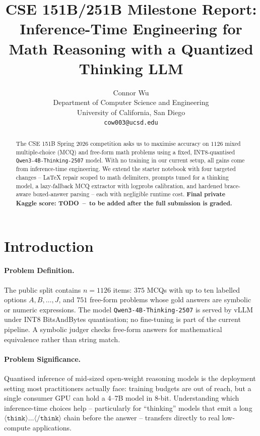 \documentclass{article}
\title{
CSE 151B/251B Milestone Report:\\
Inference-Time Engineering for Math Reasoning with a Quantized Thinking LLM
}
\author{%
  Connor Wu \\
  Department of Computer Science and Engineering\\
  University of California, San Diego\\
  \texttt{cow003@ucsd.edu} \\
}
\begin{document}
\maketitle


\begin{abstract}
The CSE 151B Spring 2026 competition asks us to maximise accuracy on $1126$
mixed multiple-choice (MCQ) and free-form math problems using a fixed,
INT8-quantised \texttt{Qwen3-4B-Thinking-2507} model. With no training in our
current setup, all gains come from inference-time engineering. We extend the
starter notebook with four targeted changes -- LaTeX repair scoped to math
delimiters, prompts tuned for a thinking model, a lazy-fallback MCQ extractor
with logprobs calibration, and hardened brace-aware boxed-answer parsing --
each with negligible runtime cost. \textbf{Final private Kaggle score:
TODO~--~to be added after the full submission is graded.}
\end{abstract}


\section{Introduction}
\label{sec:intro}

\paragraph{Problem Definition.}
The public split contains $n{=}1126$ items: $375$ MCQs with up to ten labelled
options $A,B,\dots,J$, and $751$ free-form problems whose gold answers are
symbolic or numeric expressions. The model \texttt{Qwen3-4B-Thinking-2507} is
served by vLLM under INT8 BitsAndBytes quantisation; no fine-tuning is part of
the current pipeline. A symbolic judger checks free-form answers for
mathematical equivalence rather than string match.

\paragraph{Problem Significance.}
Quantised inference of mid-sized open-weight reasoning models is the
deployment setting most practitioners actually face: training budgets are out
of reach, but a single consumer GPU can hold a 4--7B model in 8-bit.
Understanding which inference-time choices help -- particularly for
``thinking'' models that emit a long
$\langle\texttt{think}\rangle\dots\langle/\texttt{think}\rangle$ chain before
the answer -- transfers directly to real low-compute applications.
\end{document}
